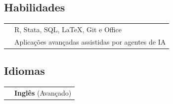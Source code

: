 \documentclass[a4paper,12pt]{article}
\begin{document}
	\subsection*{Habilidades}
	\setlength{\LTleft}{0pt}
	\begin{longtable}[t]{>{\raggedleft\arraybackslash}p{2.0cm}>{\raggedright\arraybackslash}p{13.5cm}}
			& R, Stata, SQL, \LaTeX{}, Git e Office \\
			& Aplicações avançadas assistidas por agentes de IA \\
	\end{longtable}

	\subsection*{Idiomas}
	\setlength{\LTleft}{0pt}
	\begin{longtable}[t]{>{\raggedleft\arraybackslash}p{2.0cm}>{\raggedright\arraybackslash}p{13.5cm}}
			 & \textbf{Inglês} (Avançado) \\
	\end{longtable}
\end{document}

